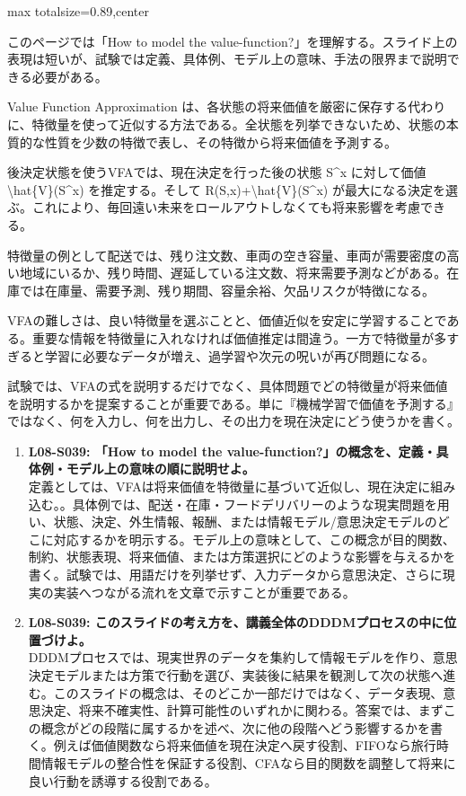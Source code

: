 \begin{minipage}[t]{0.58\textwidth}
\begin{adjustbox}{max totalsize={\textwidth}{0.89\textheight},center}
\begin{minipage}{\textwidth}\scriptsize
{}このページでは「How to model the value-function?」を理解する。スライド上の表現は短いが、試験では定義、具体例、モデル上の意味、手法の限界まで説明できる必要がある。\par
Value Function Approximation は、各状態の将来価値を厳密に保存する代わりに、特徴量を使って近似する方法である。全状態を列挙できないため、状態の本質的な性質を少数の特徴で表し、その特徴から将来価値を予測する。\par
後決定状態を使うVFAでは、現在決定を行った後の状態 S\textasciicircum{}x に対して価値 \textbackslash{}hat\{V\}(S\textasciicircum{}x) を推定する。そして R(S,x)+\textbackslash{}hat\{V\}(S\textasciicircum{}x) が最大になる決定を選ぶ。これにより、毎回遠い未来をロールアウトしなくても将来影響を考慮できる。\par
特徴量の例として配送では、残り注文数、車両の空き容量、車両が需要密度の高い地域にいるか、残り時間、遅延している注文数、将来需要予測などがある。在庫では在庫量、需要予測、残り期間、容量余裕、欠品リスクが特徴になる。\par
VFAの難しさは、良い特徴量を選ぶことと、価値近似を安定に学習することである。重要な情報を特徴量に入れなければ価値推定は間違う。一方で特徴量が多すぎると学習に必要なデータが増え、過学習や次元の呪いが再び問題になる。\par
試験では、VFAの式を説明するだけでなく、具体問題でどの特徴量が将来価値を説明するかを提案することが重要である。単に『機械学習で価値を予測する』ではなく、何を入力し、何を出力し、その出力を現在決定にどう使うかを書く。\par{}\begin{enumerate}\item \textbf{L08-S039: 「How to model the value-function?」の概念を、定義・具体例・モデル上の意味の順に説明せよ。}\\定義としては、VFAは将来価値を特徴量に基づいて近似し、現在決定に組み込む。。具体例では、配送・在庫・フードデリバリーのような現実問題を用い、状態、決定、外生情報、報酬、または情報モデル/意思決定モデルのどこに対応するかを明示する。モデル上の意味として、この概念が目的関数、制約、状態表現、将来価値、または方策選択にどのような影響を与えるかを書く。試験では、用語だけを列挙せず、入力データから意思決定、さらに現実の実装へつながる流れを文章で示すことが重要である。\item \textbf{L08-S039: このスライドの考え方を、講義全体のDDDMプロセスの中に位置づけよ。}\\DDDMプロセスでは、現実世界のデータを集約して情報モデルを作り、意思決定モデルまたは方策で行動を選び、実装後に結果を観測して次の状態へ進む。このスライドの概念は、そのどこか一部だけではなく、データ表現、意思決定、将来不確実性、計算可能性のいずれかに関わる。答案では、まずこの概念がどの段階に属するかを述べ、次に他の段階へどう影響するかを書く。例えば価値関数なら将来価値を現在決定へ戻す役割、FIFOなら旅行時間情報モデルの整合性を保証する役割、CFAなら目的関数を調整して将来に良い行動を誘導する役割である。\end{enumerate}

\end{minipage}
\end{adjustbox}
\end{minipage}

